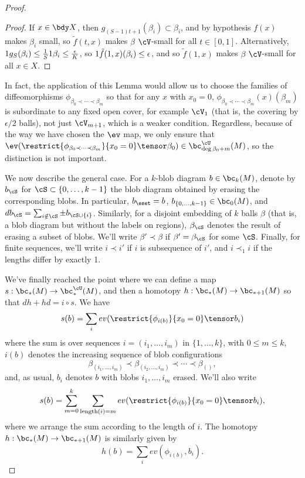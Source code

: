 \begin{proof}
\begin{proof}
If $x \in \bdy X$, then $g_{(S-1)t+1}(\beta_i) \subset \beta_i$, and by hypothesis $f(x)$ makes $\beta_i$ small, so $\tilde{f}(t, x)$ makes $\beta$ $\cV$-small for all $t \in [0,1]$. Alternatively, $1 g_S(\beta_i) \leq \frac{1}{S} 1 \beta_i \leq \frac{\epsilon}{K}$, so $1 \tilde{f}(1,x)(\beta_i) \leq \epsilon$, and so $\tilde{f}(1,x)$ makes $\beta$ $\cV$-small for all $x \in X$.
\end{proof}

In fact, the application of this Lemma would allow us to choose the families of diffeomorphisms $\phi_{\beta_0 \prec \cdots \prec \beta_m}$ so that for any $x$ with $x_0 = 0$, $\phi_{\beta_0 \prec \cdots \prec \beta_m}(x)(\beta_m)$ is subordinate to any fixed open cover, for example $\cV_1$ (that is, the covering by $\epsilon/2$ balls), not just $\cV_{m+1}$, which is a weaker condition. Regardless, because of the way we have chosen the $\ev$ map, we only ensure that $\ev(\restrict{\phi_{\beta_0 \prec \cdots \prec \beta_m}}{x_0 = 0} \tensor \beta_0) \in \bc_{\deg \beta_0 + m}^{\cU}(M)$, so the distinction is not important.

We now describe the general case. For a $k$-blob diagram $b \in \bc_k(M)$, denote by $b_\cS$ for $\cS \subset \{0, \ldots, k-1\}$ the blob diagram obtained by erasing the corresponding blobs. In particular, $b_\eset = b$, $b_{\{0,\ldots,k-1\}} \in \bc_0(M)$, and $d b_\cS = \sum_{i \notin \cS} \pm  b_{\cS \cup \{i\}}$.
Similarly, for a disjoint embedding of $k$ balls $\beta$ (that is, a blob diagram but without the labels on regions), $\beta_\cS$ denotes the result of erasing a subset of blobs. We'll write $\beta' \prec \beta$ if $\beta' = \beta_\cS$ for some $\cS$. Finally, for finite sequences, we'll write $i \prec i'$ if $i$ is subsequence of $i'$, and $i \prec_1 i$ if the lengths differ by exactly 1.



\newcommand{\length}[1]{\operatorname{length}(#1)}

We've finally reached the point where we can define a map $s: \bc_*(M) \to \bc^{\cU}_*(M)$, and then a homotopy $h:\bc_*(M) \to \bc_{*+1}(M)$ so that $dh+hd=i\circ s$.  We have
$$s(b) = \sum_{i} ev(\restrict{\phi_{i(b)}}{x_0 = 0} \tensor b_i)$$
where the sum is over sequences $i=(i_1,\ldots,i_m)$ in $\{1,\ldots,k\}$, with $0\leq m \leq k$, $i(b)$ denotes the increasing sequence of blob configurations
$$\beta_{(i_1,\ldots,i_m)} \prec \beta_{(i_2,\ldots,i_m)} \prec \cdots \prec \beta_{()},$$
and, as usual, $b_i$ denotes $b$ with blobs $i_1, \ldots, i_m$ erased. We'll also write
$$s(b) = \sum_{m=0}^{k} \sum_{\length{i}=m} ev(\restrict{\phi_{i(b)}}{x_0 = 0} \tensor b_i),$$
where we arrange the sum according to the length of $i$.
The homotopy $h:\bc_*(M) \to \bc_{*+1}(M)$ is similarly given by
$$h(b) = \sum_{i} ev(\phi_{i(b)}, b_i).$$


\end{proof}
